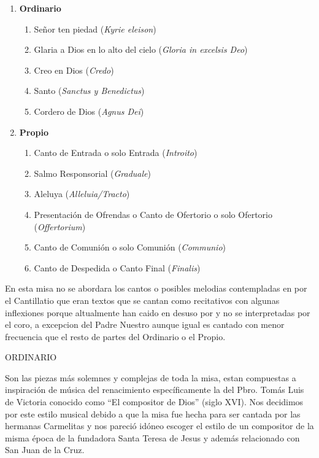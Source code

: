 \documentclass[12pt, letterpaper]{report}
\begin{document}
    \renewcommand{\theenumi}{\arabic{enumi}}
    \begin{enumerate}
        \item \textbf{Ordinario}
        \begin{enumerate}
            \item Se\~nor ten piedad (\textit{Kyrie eleison})
            \item Glaria a Dios en lo alto del cielo (\textit{Gloria in excelsis Deo})
            \item Creo en Dios (\textit{Credo})
            \item Santo (\textit{Sanctus y Benedictus})
            \item Cordero de Dios (\textit{Agnus Dei})
        \end{enumerate}

        \item \textbf{Propio}
        \begin{enumerate}
            \item Canto de Entrada o solo Entrada (\textit{Introito})
            \item Salmo Responsorial (\textit{Graduale})
            \item Aleluya (\textit{Alleluia/Tracto})
            \item Presentaci\'on de Ofrendas o Canto de Ofertorio o solo Ofertorio (\textit{Offertorium})
            \item Canto de Comuni\'on o solo Comuni\'on (\textit{Communio})
            \item Canto de Despedida o Canto Final (\textit{Finalis})
        \end{enumerate}
    \end{enumerate}

    En esta misa no se abordara los cantos o posibles melodias contempladas en por el Cantillatio que eran textos que se cantan como recitativos con algunas inflexiones porque altualmente han caido en desuso por y no se interpretadas por el coro, a excepcion del Padre Nuestro aunque igual es cantado con menor frecuencia que el resto de partes del Ordinario o el Propio.

    {\large ORDINARIO}

    Son las piezas m\'as solemnes y complejas de toda la misa, estan compuestas a inspiraci\'on de m\'usica del renacimiento espec\'ificamente la del Pbro. Tom\'as Luis de Victoria conocido como ``El compositor de Dios'' (siglo XVI). Nos decidimos por este estilo musical debido a que la misa fue hecha para ser cantada por las hermanas Carmelitas y nos pareci\'o id\'oneo escoger el estilo de un compositor de la misma \'epoca de la fundadora Santa Teresa de Jesus y adem\'as relacionado con San Juan de la Cruz.
\end{document}
